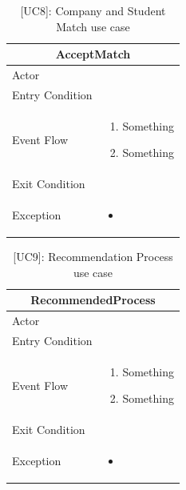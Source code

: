 \begin{table}[H]
    \centering
    \begin{tabular}{|p{3cm}|p{12cm}|}
    \hline
    \multicolumn{2}{|c|}{\textbf{AcceptMatch}} \\ \hline
    Actor & \\ \hline
    Entry Condition & \\ \hline
    Event Flow &      
    \begin{enumerate}         
        \item Something
        \item Something
    \end{enumerate} \\ \hline
    Exit Condition & \\ \hline
    Exception & 
    \begin{itemize}        
        \item     
    \end{itemize} \\ \hline
    \end{tabular}
    \caption{[UC8]: Company and Student Match use case}
    \label{tab:UC8}
\end{table}

\begin{table}[H]
    \centering
    \begin{tabular}{|p{3cm}|p{12cm}|}
    \hline
    \multicolumn{2}{|c|}{\textbf{RecommendedProcess}} \\ \hline
    Actor & \\ \hline
    Entry Condition & \\ \hline
    Event Flow &      
    \begin{enumerate}         
        \item Something
        \item Something
    \end{enumerate} \\ \hline
    Exit Condition & \\ \hline
    Exception & 
    \begin{itemize}     
        \item    
    \end{itemize} \\ \hline
    \end{tabular}
    \caption{[UC9]: Recommendation Process use case}
    \label{tab:UC9}
\end{table}

